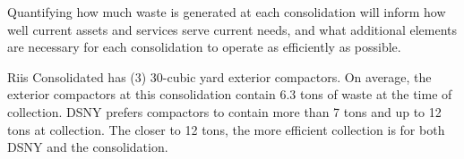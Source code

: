 
    Quantifying how much waste is generated at each consolidation will inform how well current assets and services serve current needs, and what additional elements are necessary for each consolidation to operate as efficiently as possible.
    
    Riis Consolidated has (3) 30-cubic yard exterior compactors. On average, the exterior compactors at this consolidation contain 6.3 tons of waste at the time of collection. DSNY prefers compactors to contain more than 7 tons and up to 12 tons at collection. The closer to 12 tons, the more efficient collection is for both DSNY and the consolidation.